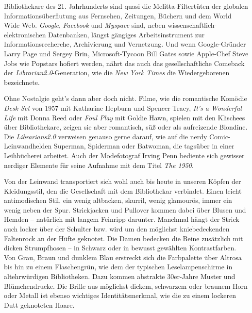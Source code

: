 \documentclass[output=paper]{langscibook}
\begin{document}
Bibliothekare des 21. Jahrhunderts sind quasi die Melitta-Filtertüten
der globalen Informationsüberflutung aus Fernsehen, Zeitungen, Büchern
und dem World Wide Web. \emph{Google}, \emph{Facebook} und
\emph{Myspace} sind, neben wissenschaftlich-elektro\-nischen Datenbanken,
längst gängiges Arbeitsinstrument zur Informationsrecherche,
Archivierung und Vernetzung. Und wenn Google-Gründer Larry Page und
Sergey Brin, Microsoft-Tycoon Bill Gates sowie Apple-Chef Steve Jobs wie
Popstars hofiert werden, nährt das auch das gesellschaftliche Comeback
der \emph{Librarian2.0}-Generation, wie die \emph{New York Times} die
Wiedergeborenen bezeichnete.

Ohne Nostalgie geht's dann aber doch nicht. Filme, wie die romantische
Komödie \emph{Desk Set} von 1957 mit Katharine Hepburn und Spencer
Tracy, \emph{It's a Wonderful Life} mit Donna Reed oder \emph{Foul Play}
mit Goldie Hawn, spielen mit den Klischees über Bibliothekare, zeigen
sie aber romantisch, süß oder als aufreizende Blondine. Die
\emph{Librarians2.0} verweisen genauso gerne darauf, wie auf die nerdy
Comic-Leinwandhelden Superman, Spiderman oder Batwoman, die tagsüber in
einer Leihbücherei arbeitet. Auch der Modefotograf Irving Penn bediente
sich gewisser nerdiger Elemente für seine Aufnahme mit dem Titel
\emph{The 1950}.

Von der Leinwand transportiert sich wohl auch bis heute in unseren
Köpfen der Kleidungsstil, den die Gesellschaft mit dem Bibliothekar
verbindet. Einen leicht antimodischen Stil, ein wenig altbacken,
skurril, wenig glamourös, immer ein wenig neben der Spur. Strickjacken
und Pullover kommen dabei über Blusen und Hemden -- natürlich mit langem
Feinripp darunter. Manchmal hängt der Strick auch locker über der
Schulter bzw. wird um den möglichst kniebedeckenden Faltenrock an der
Hüfte geknotet. Die Damen bedecken die Beine zusätzlich mit dicken
Strumpfhosen -- in Schwarz oder in bewusst gewählten Kontrastfarben. Von
Grau, Braun und dunklem Blau erstreckt sich die Farbpalette über Altrosa
bis hin zu einem Flaschengrün, wie dem der typischen Leselampenschirme
in altehrwürdigen Bibliotheken. Dazu kommen abstrakte 30er-Jahre Muster
und Blümchendrucke. Die Brille aus möglichst dickem, schwarzem oder
braunem Horn oder Metall ist ebenso wichtiges Identitätsmerkmal, wie die
zu einem lockeren Dutt geknoteten Haare.
\end{document}
